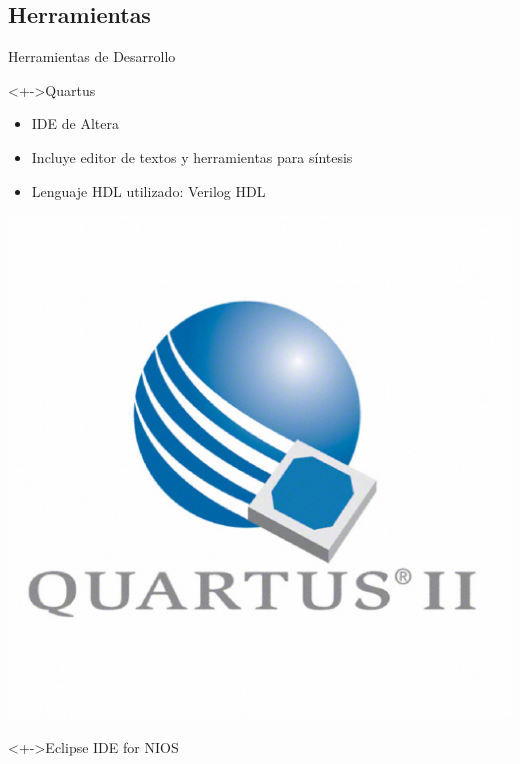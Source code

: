 \documentclass[xcolor=dvipsnames]{beamer}
\begin{document}
\subsection{Herramientas}
\begin{frame}{Herramientas de Desarrollo}
\begin{block}<+->{Quartus} 
	
    \begin{itemize}
      \scriptsize
     	\item IDE de Altera
	\item Incluye editor de textos y herramientas para síntesis
	\item Lenguaje HDL utilizado: Verilog HDL
    \end{itemize} 
	\center
	\includegraphics[scale=0.10]{figures/Quartus.eps}  
  \end{block}
  \begin{block}<+->{Eclipse IDE for NIOS}   
	

\end{block}
\end{frame}
\end{document}
